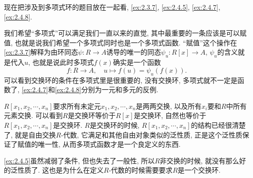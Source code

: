 \begin{remark}
    现在把涉及到多项式环的题目放在一起看, \ref{ex:2.3.7}, \ref{ex:2.4.5}, \ref{ex:2.4.7}, \ref{ex:2.4.8}.
    
    我们希望“多项式”可以满足我们一直以来的直觉, 其中最重要的一条应该是可以赋值, 也就是说我们希望一个多项式同时也是一个多项式函数. “赋值”这个操作在\ref{ex:2.3.7}解释为由环同态$\psi:R \to A$诱导的唯一的同态$\psi_u:R[x] \to A$, $\psi_u$的含义就是代入$u$, 也就是说此时多项式$f(x)$确实是一个函数
    \[
        f:R \to A,\quad u \mapsto f(u) = \psi_u(f(x)).
    \]
    可以看到交换环的条件在多项式里是很重要的, 没有交换环, 多项式就不一定是函数了, \ref{ex:2.4.7}和\ref{ex:2.4.8}分别为一元和多元的反例.
    
    $R[x_1, x_2, \cdots, x_n]$要求所有未定元$x_1, x_2, \cdots, x_n$是两两交换, 以及所有$x_i$要和$R$中所有元素交换. 可以看到$R$是交换环等价于$R[x]$是交换环, 自然也等价于$R[x_1, x_2, \cdots, x_n]$是交换环. $R$是交换环的时候, $R[x_1, x_2, \cdots, x_n]$的结构已经很清楚了, 就是自由交换$R$-代数, 它满足和其他自由对象类似的泛性质, 正是这个泛性质保证了赋值的唯一性, 从而多项式函数才是一个良定义的东西.

    \ref{ex:2.4.5}虽然减弱了条件, 但也失去了一般性, 所以$R$非交换的时候, 就没有那么好的泛性质了. 这也是为什么在定义$R$-代数的时候需要要求$R$是一个交换环.
\end{remark}